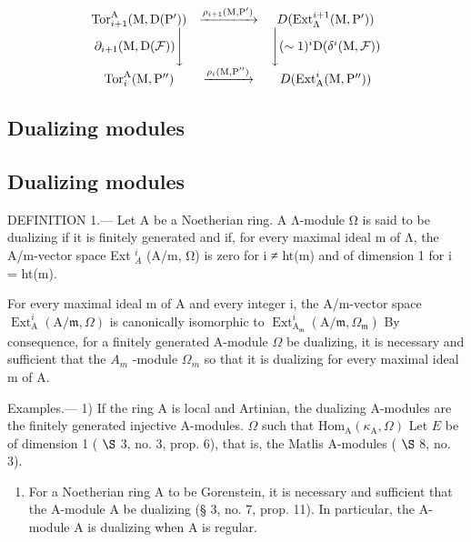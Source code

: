 \[
\begin{array}{c c c} \operatorname{Tor} _ {i + 1} ^ {\mathrm{A}} (\mathrm{M}, \mathrm{D} (\mathrm{P} ^ {\prime})) & \xrightarrow {\rho_ {i + 1} (\mathrm{M} , \mathrm{P} ^ {\prime})} & D (\operatorname{Ext} _ {\Lambda} ^ {i + 1} (\mathrm{M}, \mathrm{P} ^ {\prime})) \\ \partial_ {i + 1} (\mathrm{M}, \mathrm{D} (\mathcal {F})) \Bigg \downarrow & & \Bigg \downarrow (\sim 1) ^ {i} \mathrm{D} (\delta^ {i} (\mathrm{M}, \mathcal {F})) \\ \operatorname{Tor} _ {i} ^ {\mathrm{A}} (\mathrm{M}, \mathrm{P} ^ {\prime \prime}) & \xrightarrow {\rho_ {i} (\mathrm{M} , \mathrm{P} ^ {\prime \prime})} & D (\operatorname{Ext} _ {\mathrm{A}} ^ {i} (\mathrm{M}, \mathrm{P} ^ {\prime \prime})) \end{array}
\]

\subsection{Dualizing modules}

\subsection{Dualizing modules}

DEFINITION 1.--- Let A be a Noetherian ring. A Λ-module Ω is said to be dualizing if it is finitely generated and if, for every maximal ideal m of Λ, the A/m-vector space Ext \(_{A}^{i}\) (A/m, Ω) is zero for i ≠ ht(m) and of dimension 1 for i = ht(m).

For every maximal ideal m of A and every integer i, the A/m-vector space \(\operatorname{Ext}_{\mathrm{A}}^{i}(\mathrm{A}/\mathfrak{m},\Omega)\) is canonically isomorphic to \(\operatorname{Ext}_{\mathrm{A}_{\mathfrak{m}}}^{i}(\mathrm{A}/\mathfrak{m},\Omega_{\mathfrak{m}})\) By consequence, for a finitely generated A-module \(\Omega\) be dualizing, it is necessary and sufficient that the \(A_{m}\) -module \(\Omega_{m}\) so that it is dualizing for every maximal ideal m of A.

Examples.--- 1) If the ring A is local and Artinian, the dualizing A-modules are the finitely generated injective A-modules. \(\Omega\) such that \(\mathrm{Hom}_{\mathrm{A}}(\kappa_{\mathrm{A}},\Omega)\) Let \( E \) be of dimension 1 ( \(\S\) 3, no. 3, prop. 6), that is, the Matlis A-modules ( \(\S\) 8, no. 3).

\begin{enumerate}
\def\labelenumi{\arabic{enumi})}
\setcounter{enumi}{1}
\tightlist
\item
  For a Noetherian ring A to be Gorenstein, it is necessary and sufficient that the A-module A be dualizing (§ 3, no. 7, prop. 11). In particular, the A-module A is dualizing when A is regular.
\end{enumerate}

